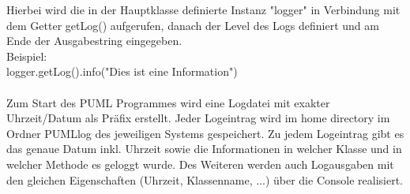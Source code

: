 Hierbei wird die in der Hauptklasse definierte Instanz "logger" in Verbindung mit dem Getter getLog() aufgerufen, danach der Level des Logs definiert und am Ende der Ausgabestring eingegeben.\\
Beispiel:\\
logger.getLog().info("Dies ist eine Information")\\
\\
Zum Start des PUML Programmes wird eine Logdatei mit exakter Uhrzeit/Datum als Präfix erstellt.
Jeder Logeintrag wird im home directory im Ordner PUMLlog des jeweiligen Systems gespeichert. Zu jedem Logeintrag gibt es das genaue Datum inkl. Uhrzeit sowie die Informationen in welcher Klasse und in welcher Methode es geloggt wurde.
Des Weiteren werden auch Logausgaben mit den gleichen Eigenschaften (Uhrzeit, Klassenname, ...) über die Console realisiert.
\nsecend %
\nsecend %

